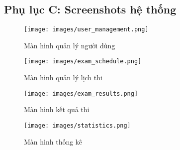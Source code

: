 \documentclass[12pt,a4paper]{article}
\begin{document}
\subsection{Phụ lục C: Screenshots hệ thống}

\begin{figure}[H]
\centering
\texttt{[image: images/user\_management.png]}
\caption{Màn hình quản lý người dùng}
\label{fig:user_management}
\end{figure}

\begin{figure}[H]
\centering
\texttt{[image: images/exam\_schedule.png]}
\caption{Màn hình quản lý lịch thi}
\label{fig:exam_schedule}
\end{figure}

\begin{figure}[H]
\centering
\texttt{[image: images/exam\_results.png]}
\caption{Màn hình kết quả thi}
\label{fig:exam_results}
\end{figure}

\begin{figure}[H]
\centering
\texttt{[image: images/statistics.png]}
\caption{Màn hình thống kê}
\label{fig:statistics}
\end{figure}
\end{document}

